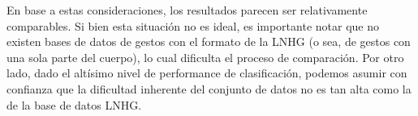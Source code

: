 En base a estas consideraciones, los resultados parecen ser relativamente comparables. Si bien esta situación no es ideal, es importante notar que no existen bases de datos de gestos con el formato de la LNHG (o sea, de gestos con una sola parte del cuerpo), lo cual dificulta el proceso de comparación. Por otro lado, dado el altísimo nivel de performance de clasificación, podemos asumir con confianza que la dificultad inherente del conjunto de datos no es tan alta como la de la base de datos LNHG.
